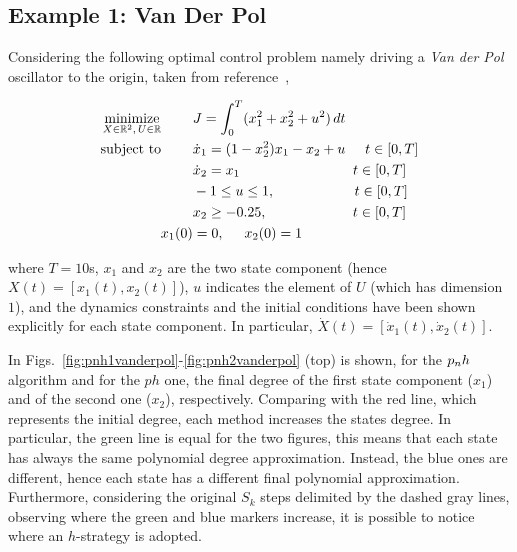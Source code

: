 \subsection*{Example 1: Van Der Pol}
Considering the following optimal control problem namely
driving a \emph{Van der Pol} oscillator to the origin, taken from reference~\cite{casadi:DOC:2018},

\begin{subequations}\label{eq:vanderpol}
	\begin{align}
	\underset{X \in \mathbb{R}^{2}, \, U \in \mathbb{R}}{\text{minimize}}\hspace{8mm}
	&J = \int_{0}^{T}(x_1^{2} + x_2^{2} + u^{2})\,dt  \label{eq:vancost}\\
	\text{subject to} \hspace{8mm}
	& \dot{x}_1 = (1 - x_2^{2})x_{1} - x_2 + u \hspace{5mm} t \in[0,T] \label{eq:vandyn1}\\
	& \dot{x}_2 = x_1 \hspace{28.5mm} t \in[0,T] \label{eq:vandyn2}\\
	& -1  \leq u \leq 1,  \hspace{20mm} t \in[0,T] \label{eq:vanpath1}\\
	& x_2 \geq -0.25,  \hspace{21.5mm} t \in[0,T] \label{eq:vanpath2}\\
	 x_1(0) &= 0, \hspace{5mm} x_2(0) = 1 \label{eq:initial1}\\		
	\end{align}
\end{subequations}

where $T = 10$s, $x_1$ and $x_2$ are the two state component (hence $X(t) = [x_1(t), x_2(t)]$), $u$ indicates the element of $U$ (which has dimension $1$), and the dynamics constraints and the initial conditions have been shown explicitly for each state component. In particular, $\dot{X}(t) = [\dot{x}_1(t), \dot{x}_2(t)]$.

In Figs.~\ref{fig:pnh1vanderpol}-\ref{fig:pnh2vanderpol} (top) is shown, for the $p_{n}h$ algorithm and for the $ph$ one, the final degree of the first state component ($x_1$) and of the second one ($x_2$), respectively. Comparing with the red line, which represents the initial degree, each method increases the states degree. In particular, the green line is equal for the two figures, this means that each state has always the same polynomial degree approximation. Instead, the blue ones are different, hence each state has a different final polynomial approximation. Furthermore, considering the original $S_k$ steps delimited by the dashed gray lines, observing where the green and blue markers increase, it is possible to notice where an $h$-strategy is adopted.

